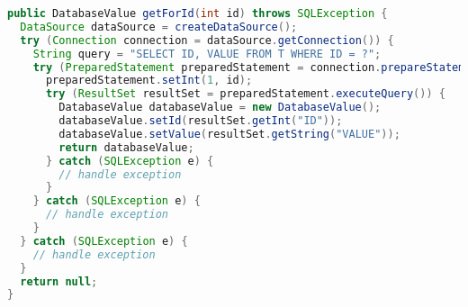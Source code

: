 
\begin{lstlisting}[language=Java, caption={Example of loading data using try-with-resources}, label={code:jdbc-try-with-resources}]
public DatabaseValue getForId(int id) throws SQLException {
  DataSource dataSource = createDataSource();
  try (Connection connection = dataSource.getConnection()) {
    String query = "SELECT ID, VALUE FROM T WHERE ID = ?";
    try (PreparedStatement preparedStatement = connection.prepareStatement(query)) {
      preparedStatement.setInt(1, id);
      try (ResultSet resultSet = preparedStatement.executeQuery()) {
        DatabaseValue databaseValue = new DatabaseValue();
        databaseValue.setId(resultSet.getInt("ID"));
        databaseValue.setValue(resultSet.getString("VALUE"));
        return databaseValue;
      } catch (SQLException e) {
        // handle exception
      }
    } catch (SQLException e) {
      // handle exception
    }
  } catch (SQLException e) {
    // handle exception
  }
  return null;
}
\end{lstlisting}
